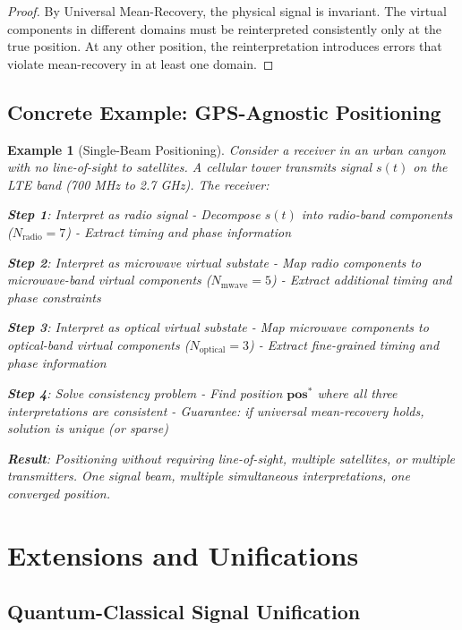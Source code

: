 \documentclass[twocolumn,11pt,a4paper]{article}
\newtheorem{example}[theorem]{Example}
\newcommand{\signal}{s}
\begin{document}
\begin{proof}
By Universal Mean-Recovery, the physical signal is invariant. The virtual components in different domains must be reinterpreted consistently only at the true position. At any other position, the reinterpretation introduces errors that violate mean-recovery in at least one domain.
\end{proof}

\subsection{Concrete Example: GPS-Agnostic Positioning}

\begin{example}[Single-Beam Positioning]
Consider a receiver in an urban canyon with no line-of-sight to satellites. A cellular tower transmits signal $\signal(t)$ on the LTE band (700 MHz to 2.7 GHz). The receiver:

\textbf{Step 1}: Interpret as radio signal
- Decompose $\signal(t)$ into radio-band components ($N_{\text{radio}} = 7$)
- Extract timing and phase information

\textbf{Step 2}: Interpret as microwave virtual substate
- Map radio components to microwave-band virtual components ($N_{\text{mwave}} = 5$)
- Extract additional timing and phase constraints

\textbf{Step 3}: Interpret as optical virtual substate
- Map microwave components to optical-band virtual components ($N_{\text{optical}} = 3$)
- Extract fine-grained timing and phase information

\textbf{Step 4}: Solve consistency problem
- Find position $\mathbf{pos}^*$ where all three interpretations are consistent
- Guarantee: if universal mean-recovery holds, solution is unique (or sparse)

\textbf{Result}: Positioning without requiring line-of-sight, multiple satellites, or multiple transmitters. One signal beam, multiple simultaneous interpretations, one converged position.
\end{example}

\section{Extensions and Unifications}
\label{sec:extensions}

\subsection{Quantum-Classical Signal Unification}
\end{document}
